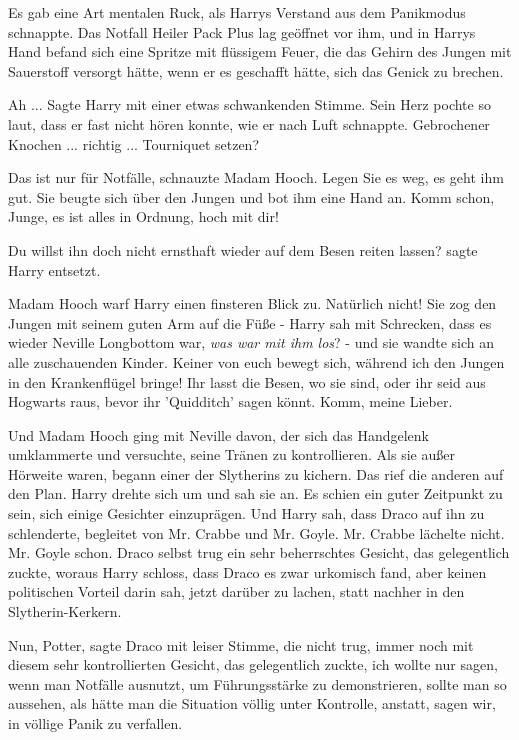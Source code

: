 Es gab eine Art mentalen Ruck, als Harrys Verstand aus dem Panikmodus schnappte.
Das Notfall Heiler Pack Plus lag geöffnet vor ihm, und in Harrys Hand befand
sich eine Spritze mit flüssigem Feuer, die das Gehirn des Jungen mit Sauerstoff
versorgt hätte, wenn er es geschafft hätte, sich das Genick zu brechen.

\glqq{}Ah ...\grqq{} Sagte Harry mit einer etwas schwankenden Stimme. Sein Herz
pochte so laut, dass er fast nicht hören konnte, wie er nach Luft schnappte.
\glqq{}Gebrochener Knochen ... richtig ... Tourniquet setzen?\grqq{}

\glqq{}Das ist nur für Notfälle\grqq{}, schnauzte Madam Hooch. \glqq{}Legen Sie es
weg, es geht ihm gut.\grqq{} Sie beugte sich über den Jungen und bot ihm eine
Hand an. \glqq{}Komm schon, Junge, es ist alles in Ordnung, hoch mit dir!\grqq{}

\glqq{}Du willst ihn doch nicht ernsthaft wieder auf dem Besen reiten
lassen?\grqq{} sagte Harry entsetzt.

Madam Hooch warf Harry einen finsteren Blick zu. \glqq{}Natürlich nicht!\grqq{}
Sie zog den Jungen mit seinem guten Arm auf die Füße - Harry sah mit Schrecken,
dass es wieder Neville Longbottom war, \emph{was war mit ihm los}? - und sie
wandte sich an alle zuschauenden Kinder. \glqq{}Keiner von euch bewegt sich,
während ich den Jungen in den Krankenflügel bringe! Ihr lasst die Besen, wo sie
sind, oder ihr seid aus Hogwarts raus, bevor ihr 'Quidditch' sagen könnt. Komm,
meine Lieber.\grqq{}

Und Madam Hooch ging mit Neville davon, der sich das Handgelenk umklammerte und
versuchte, seine Tränen zu kontrollieren. Als sie außer Hörweite waren, begann
einer der Slytherins zu kichern. Das rief die anderen auf den Plan. Harry drehte
sich um und sah sie an. Es schien ein guter Zeitpunkt zu sein, sich einige
Gesichter einzuprägen. Und Harry sah, dass Draco auf ihn zu schlenderte,
begleitet von Mr. Crabbe und Mr. Goyle. Mr. Crabbe lächelte nicht. Mr. Goyle
schon. Draco selbst trug ein sehr beherrschtes Gesicht, das gelegentlich zuckte,
woraus Harry schloss, dass Draco es zwar urkomisch fand, aber keinen politischen
Vorteil darin sah, jetzt darüber zu lachen, statt nachher in den
Slytherin-Kerkern.

\glqq{}Nun, Potter\grqq{}, sagte Draco mit leiser Stimme, die nicht trug, immer
noch mit diesem sehr kontrollierten Gesicht, das gelegentlich zuckte, \glqq{}ich
wollte nur sagen, wenn man Notfälle ausnutzt, um Führungsstärke zu
demonstrieren, sollte man so aussehen, als hätte man die Situation völlig unter
Kontrolle, anstatt, sagen wir, in völlige Panik zu verfallen.\grqq{}

